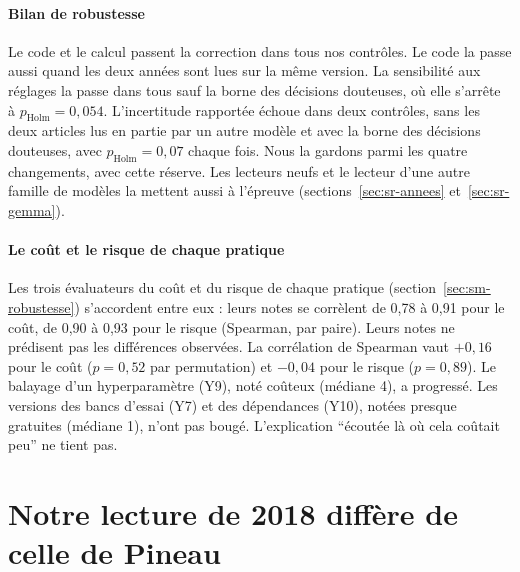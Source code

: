 \paragraph{Bilan de robustesse}
Le code et le calcul passent la correction dans tous nos contrôles. Le code la passe aussi quand les deux années
sont lues sur la même version. La sensibilité aux réglages la passe
dans tous sauf la borne des décisions douteuses, où elle s'arrête à $p_{\text{Holm}} = 0{,}054$.
L'incertitude rapportée échoue dans deux contrôles, sans les deux articles lus en partie par un autre
modèle et avec la borne des décisions douteuses, avec $p_{\text{Holm}} = 0{,}07$ chaque fois. Nous la
gardons parmi les quatre changements, avec cette réserve. Les lecteurs neufs et le lecteur d'une autre
famille de modèles la mettent aussi à l'épreuve (sections~\ref{sec:sr-annees} et~\ref{sec:sr-gemma}).

\paragraph{Le coût et le risque de chaque pratique}
Les trois évaluateurs du coût et du risque de chaque pratique (section~\ref{sec:sm-robustesse})
s'accordent entre eux : leurs notes se corrèlent de 0,78 à 0,91 pour le coût, de
0,90 à 0,93 pour le risque (Spearman, par paire). Leurs notes ne prédisent pas les différences observées. La
corrélation de Spearman vaut $+0{,}16$ pour le coût ($p = 0{,}52$ par permutation) et $-0{,}04$ pour le
risque ($p = 0{,}89$). Le balayage d'un hyperparamètre (Y9), noté coûteux (médiane 4), a progressé. Les
versions des bancs d'essai (Y7) et des dépendances (Y10), notées presque gratuites (médiane 1), n'ont pas
bougé. L'explication \enquote{écoutée là où cela coûtait peu} ne tient pas.

\section{Notre lecture de 2018 diffère de celle de Pineau}\label{sec:sr-pineau}

